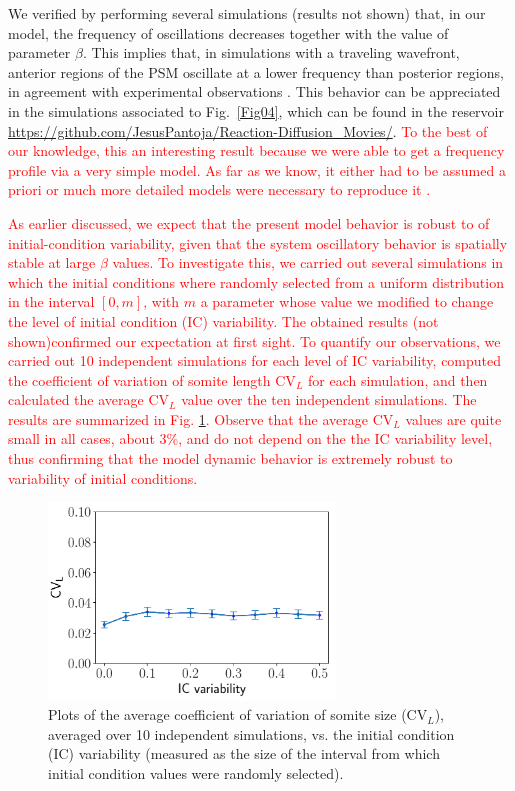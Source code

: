 \documentclass[%
 preprint,
 aip, 
 amsmath,amssymb,
]{revtex4-2}
\begin{document}
We verified by performing several simulations (results not shown) that, in our model, the frequency of oscillations decreases together with the value of parameter $\beta$. This implies that, in simulations  with a traveling wavefront, anterior regions of the PSM oscillate at a lower frequency than posterior regions, in agreement with experimental observations \cite{Goldbeter2008, Hester2011}. This behavior can be appreciated in the simulations associated to Fig.~\ref{Fig04}, which can be found in the reservoir \url{https://github.com/JesusPantoja/Reaction-Diffusion_Movies/}. \textcolor{red}{To the best of our knowledge, this an interesting result because we were able to get a frequency profile via a very simple model. As far as we know, it either had to be assumed a priori \cite{Morelli2009} or much more detailed models were necessary to reproduce it \cite{Hester2011}.}
	
\textcolor{red}{As earlier discussed, we expect that the present model behavior is robust to  of initial-condition variability, given that the system  oscillatory behavior is spatially stable at large $\beta$ values. To investigate this, we carried out several simulations in which the initial conditions where randomly selected from a uniform distribution in the interval $[0, m]$, with $m$ a parameter whose value we modified to change the level of initial condition (IC)  variability. The obtained results (not shown)confirmed our expectation at first sight. To quantify our observations, we carried out 10 independent simulations for each level of IC variability, computed the coefficient of variation of somite length $\text{CV}_L$ for each simulation, and then calculated the average $\text{CV}_L$ value over the ten independent simulations. The results are summarized in Fig. \ref{Fig06_1}. Observe that the average $\text{CV}_L$ values are quite small in all cases, about 3\%, and do not depend on the the IC variability level, thus confirming that the model dynamic behavior is extremely robust to variability of initial conditions. }

\begin{figure}
	\centering
	\includegraphics[width=3in]{Figures/Fig06_1}
	\caption{Plots of the average coefficient of variation of somite size ($\text{CV}_L$), averaged over 10 independent simulations, vs. the initial condition (IC) variability (measured as the size of the interval from which initial condition values were randomly selected).}
	\label{Fig06_1}
\end{figure}
\end{document}
